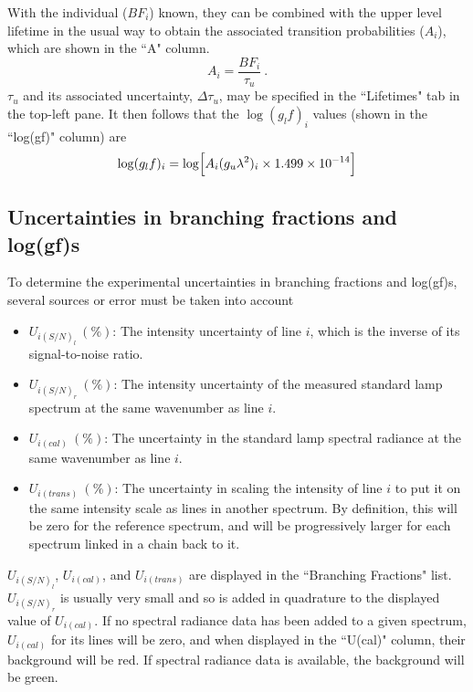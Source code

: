 \documentclass[a4paper,12pt]{report}
\begin{document}
With the individual ($BF_i$) known, they can be combined with the upper level lifetime in the usual way to obtain the associated transition probabilities ($A_i$), which are shown in the ``A" column.
\begin{equation}
A_i = \frac{BF_i}{\tau_u}~.
\end{equation}
$\tau_u$ and its associated uncertainty, $\Delta\tau_u$, may be specified in the ``Lifetimes" tab in the top-left pane. It then follows that the $\log(g_lf)_i$ values (shown in the ``log(gf)" column) are
\begin{equation}
\log(g_lf)_i = \log\Bigl[A_i(g_u \lambda^2)_i\times 1.499\times 10^{-14} \Bigr]
\end{equation}

\subsection{Uncertainties in branching fractions and log(gf)s}
To determine the experimental uncertainties in branching fractions and log(gf)s, several sources or error must be taken into account
\begin{itemize}
\item $U_{i(S/N)_l}~(\%)$: The intensity uncertainty of line $i$, which is the inverse of its signal-to-noise ratio.
\item $U_{i(S/N)_r}~(\%)$: The intensity uncertainty of the measured standard lamp spectrum at the same wavenumber as line $i$.
\item $U_{i(cal)}~(\%)$: The uncertainty in the standard lamp spectral radiance at the same wavenumber as line $i$.
\item $U_{i(trans)}~(\%)$: The uncertainty in scaling the intensity of line $i$ to put it on the same intensity scale as lines in another spectrum. By definition, this will be zero for the reference spectrum, and will be progressively larger for each spectrum linked in a chain back to it.
\end{itemize}

$U_{i(S/N)_l}$, $U_{i(cal)}$, and $U_{i(trans)}$ are displayed in the ``Branching Fractions" list. $U_{i(S/N)_r}$ is usually very small and so is added in quadrature to the displayed value of  $U_{i(cal)}$. If no spectral radiance data has been added to a given spectrum, $U_{i(cal)}$ for its lines will be zero, and when displayed in the ``U(cal)" column, their background will be \colorbox{int_not_calibrated}{red}. If spectral radiance data is available, the background will be \colorbox{int_calibrated}{green}.
\end{document}
